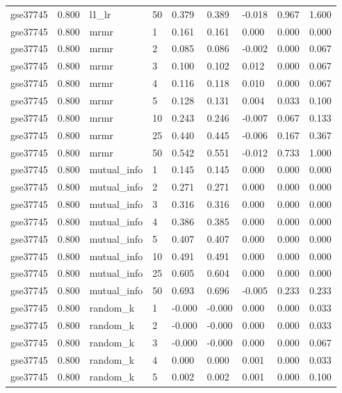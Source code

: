 \begin{table}[t]
\begin{tabular}{lllllllll}
    gse37745 & 0.800 & l1\_lr & 50 & 0.379 & 0.389 & -0.018 & 0.967 & 1.600 \\
    gse37745 & 0.800 & mrmr & 1 & 0.161 & 0.161 & 0.000 & 0.000 & 0.000 \\
    gse37745 & 0.800 & mrmr & 2 & 0.085 & 0.086 & -0.002 & 0.000 & 0.067 \\
    gse37745 & 0.800 & mrmr & 3 & 0.100 & 0.102 & 0.012 & 0.000 & 0.067 \\
    gse37745 & 0.800 & mrmr & 4 & 0.116 & 0.118 & 0.010 & 0.000 & 0.067 \\
    gse37745 & 0.800 & mrmr & 5 & 0.128 & 0.131 & 0.004 & 0.033 & 0.100 \\
    gse37745 & 0.800 & mrmr & 10 & 0.243 & 0.246 & -0.007 & 0.067 & 0.133 \\
    gse37745 & 0.800 & mrmr & 25 & 0.440 & 0.445 & -0.006 & 0.167 & 0.367 \\
    gse37745 & 0.800 & mrmr & 50 & 0.542 & 0.551 & -0.012 & 0.733 & 1.000 \\
    gse37745 & 0.800 & mutual\_info & 1 & 0.145 & 0.145 & 0.000 & 0.000 & 0.000 \\
    gse37745 & 0.800 & mutual\_info & 2 & 0.271 & 0.271 & 0.000 & 0.000 & 0.000 \\
    gse37745 & 0.800 & mutual\_info & 3 & 0.316 & 0.316 & 0.000 & 0.000 & 0.000 \\
    gse37745 & 0.800 & mutual\_info & 4 & 0.386 & 0.385 & 0.000 & 0.000 & 0.000 \\
    gse37745 & 0.800 & mutual\_info & 5 & 0.407 & 0.407 & 0.000 & 0.000 & 0.000 \\
    gse37745 & 0.800 & mutual\_info & 10 & 0.491 & 0.491 & 0.000 & 0.000 & 0.000 \\
    gse37745 & 0.800 & mutual\_info & 25 & 0.605 & 0.604 & 0.000 & 0.000 & 0.000 \\
    gse37745 & 0.800 & mutual\_info & 50 & 0.693 & 0.696 & -0.005 & 0.233 & 0.233 \\
    gse37745 & 0.800 & random\_k & 1 & -0.000 & -0.000 & 0.000 & 0.000 & 0.033 \\
    gse37745 & 0.800 & random\_k & 2 & -0.000 & -0.000 & 0.000 & 0.000 & 0.033 \\
    gse37745 & 0.800 & random\_k & 3 & -0.000 & -0.000 & 0.000 & 0.000 & 0.067 \\
    gse37745 & 0.800 & random\_k & 4 & 0.000 & 0.000 & 0.001 & 0.000 & 0.033 \\
    gse37745 & 0.800 & random\_k & 5 & 0.002 & 0.002 & 0.001 & 0.000 & 0.100 \\

\end{tabular}
\end{table}
